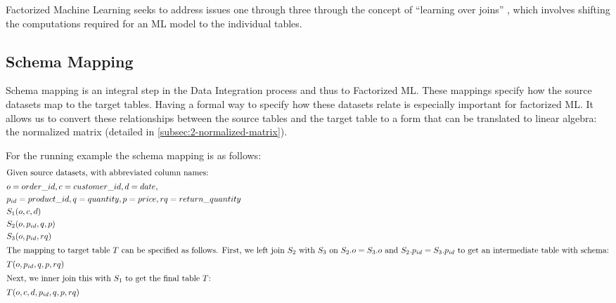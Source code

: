 Factorized Machine Learning seeks to address issues one through three through the concept of ``learning over joins'' \cite{orion_learning_gen_lin_models}, which involves shifting the computations required for an ML model to the individual tables.

\subsection{Schema Mapping}
Schema mapping is an integral step in the Data Integration process and thus to Factorized ML. These mappings specify how the source datasets map to the target tables. Having a formal way to specify how these datasets relate is especially important for factorized ML. It allows us to convert these relationships between the source tables and the target table to a form that can be translated to linear algebra: the normalized matrix (detailed in \autoref{subsec:2-normalized-matrix}).

For the running example the schema mapping is as follows:
\begin{alignat*}{2}
  \intertext{Given source datasets, with abbreviated column names:}
   & o=order\_id, c=customer\_id, d=date,                           \\
   & p_{id}=product\_id, q=quantity, p=price, rq=return\_quantity   \\
   & S_1(o, c, d)                                                   \\
   & S_2(o, p_{id} , q,  p)                                         \\
   & S_3(o, p_{id}, rq)                                           & \\
  \intertext{The mapping to target table $T$ can be specified as follows. First, we left join $S_2$ with $S_3$ on $S_{2}.o=S_{3}.o$ and $S_{2}.p_{id}=S_{3}.p_{id}$ to get an intermediate table with schema:}
   & T(o, p_{id}, q, p, rq)                                         \\
  \intertext{Next, we inner join this with $S_1$ to get the final table $T$:}
   & T(o, c, d, p_{id}, q, p, rq)                                   \\
\end{alignat*}


